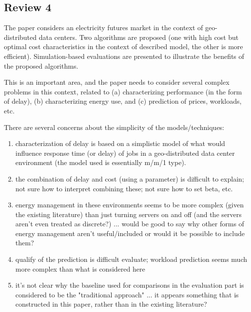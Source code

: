 \subsection{Review 4}

The paper considers an electricity futures market in the context of geo-distributed data centers.  Two algorithms are proposed (one with high cost but optimal cost characteristics in the context of described model, the other is more efficient).  Simulation-based evaluations are presented to illustrate the benefits of the proposed algorithms.

This is an important area, and the paper needs to consider several complex problems in this context, related to (a) characterizing performance (in the form of delay), (b) characterizing energy use, and (c) prediction of prices, workloads, etc.

There are several concerns about the simplicity of the models/techniques:

\begin{enumerate}
	\item characterization of delay is based on a simplistic model of what would influence response time (or delay) of jobs in a geo-distributed data center environment (the model used is essentially m/m/1 type). 
	
	\item  the combination of delay and cost (using a parameter) is difficult to explain; not sure how to interpret combining these; not sure how to set beta, etc. 
	
	\item energy management in these environments seems to be more complex (given the existing literature) than just turning servers on and off (and the servers aren't even treated as discrete?) ... would be good to say why other forms of energy management aren't useful/included or would it be possible to include them? 
	
	\item qualify of the prediction is difficult evaluate; workload prediction seems much more complex than what is considered here
	
	\item  it's not clear why the baseline used for comparisons in the evaluation part is considered to be the "traditional approach" ... it appears something that is constructed in this paper, rather than in the existing literature? 
\end{enumerate}

